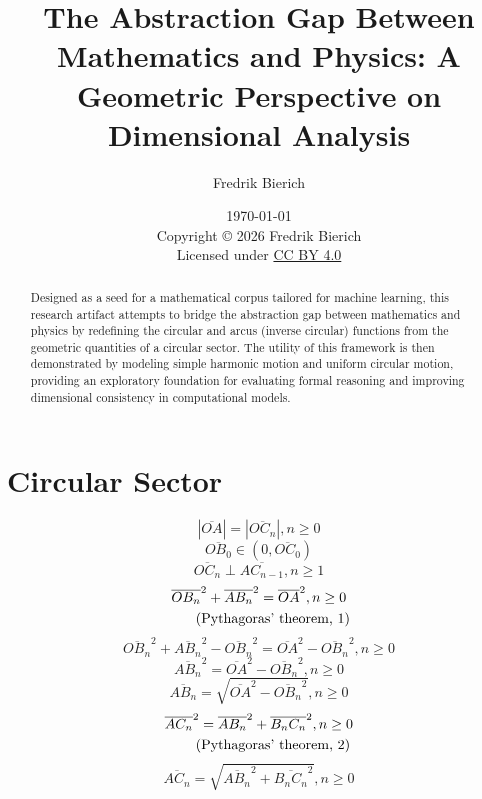 \documentclass[a4paper,12pt]{report}
\title{The Abstraction Gap Between Mathematics and Physics: A Geometric Perspective on Dimensional Analysis}
\author{Fredrik Bierich \orcidlink{https://orcid.org/0009-0008-0263-0950} \\ \email{fredrik.bierich@gmail.com}}
\date{\today \\ Copyright © 2026 Fredrik Bierich \\ Licensed under \href{https://creativecommons.org}{CC BY 4.0}}
\newcommand{\equationnote}[1]{%
    \refstepcounter{equation}%
    \tag{#1, \theequation}%
}
\begin{document}
\maketitle
\begin{abstract}
Designed as a seed for a mathematical corpus tailored for machine learning, this research artifact attempts to bridge the abstraction gap between mathematics and physics by redefining the circular and arcus (inverse circular) functions from the geometric quantities of a circular sector. The utility of this framework is then demonstrated by modeling simple harmonic motion and uniform circular motion, providing an exploratory foundation for evaluating formal reasoning and improving dimensional consistency in computational models.
\end{abstract}
\section*{Circular Sector}
\begin{equation}
|\overline{OA}| = |\overline{OC_n}|, n \geq 0
\end{equation}
\begin{equation}
\overline{OB_0} \in (0,\overline{OC_0})
\end{equation}
\begin{equation}
\overline{OC_n} \perp \overline{AC_{n-1}}, n \geq 1
\end{equation}
\begin{gather}
\overline{OB_n}^2 + \overline{AB_n}^2 = \overline{OA}^2, n \geq 0 \notag \\
\equationnote{Pythagoras' theorem}
\end{gather}
\begin{equation}
\overline{OB_n}^2 + \overline{AB_n}^2 - \overline{OB_n}^2 = \overline{OA}^2 - \overline{OB_n}^2, n \geq 0
\end{equation}
\begin{equation}
\overline{AB_n}^2 = \overline{OA}^2 - \overline{OB_n}^2, n \geq 0
\end{equation}
\begin{equation}
\overline{AB_n} = \sqrt{\overline{OA}^2 - \overline{OB_n}^2}, n \geq 0
\end{equation}
\begin{gather}
\overline{AC_n}^2 = \overline{AB_n}^2 + \overline{B_nC_n}^2, n \geq 0 \notag \\
\equationnote{Pythagoras' theorem}
\end{gather}
\begin{equation}
\overline{AC_n} = \sqrt{\overline{AB_n}^2 + \overline{B_nC_n}^2}, n \geq 0
\end{equation}
\end{document}
